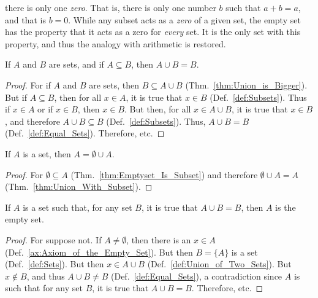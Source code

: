         there is only one \textit{zero}. That is, there is
        only one number $b$ such that $a+b=a$, and that is
        $b=0$. While any subset acts as a \textit{zero} of a
        given set, the empty set has the property that it
        acts as a zero for \textit{every} set. It is the only
        set with this property, and thus the analogy with
        arithmetic is restored.
        \begin{theorem}
            \label{thm:Union_With_Subset}%
            If $A$ and $B$ are sets, and if
            $A\subseteq{B}$, then $A\cup{B}=B$.
        \end{theorem}
        \begin{proof}
            For if $A$ and $B$ are sets, then
            $B\subseteq{A}\cup{B}$
            (Thm.~\ref{thm:Union_is_Bigger}).
            But if $A\subseteq{B}$, then for all $x\in{A}$,
            it is true that $x\in{B}$
            (Def.~\ref{def:Subsets}). Thus if $x\in{A}$ or if
            $x\in{B}$, then $x\in{B}$. But then, for all
            $x\in{A}\cup{B}$, it is true that $x\in{B}$, and
            therefore $A\cup{B}\subseteq{B}$
            (Def.~\ref{def:Subsets}). Thus,
            $A\cup{B}=B$ (Def.~\ref{def:Equal_Sets}).
            Therefore, etc.
        \end{proof}
        \begin{theorem}
            \label{thm:Union_with_Emptyset}%
            If $A$ is a set, then $A=\emptyset\cup{A}$.
        \end{theorem}
        \begin{proof}
            For $\emptyset\subseteq{A}$
            (Thm.~\ref{thm:Emptyset_Is_Subset}) and
            therefore $\emptyset\cup{A}=A$
            (Thm.~\ref{thm:Union_With_Subset}).
        \end{proof}
        \begin{theorem}
            \label{thm:Empty_Set_Is_Zero_for_Unions}%
            If $A$ is a set such that, for any set $B$, it is
            true that $A\cup{B}=B$, then $A$ is the
            empty set.
        \end{theorem}
        \begin{proof}
            For suppose not. If $A\ne\emptyset$, then there
            is an $x\in{A}$ (Def.~\ref{ax:Axiom_of_the_Empty_Set}).
            But then $B=\{A\}$ is a set
            (Def.~\ref{def:Sets}). But then $x\in{A}\cup{B}$
            (Def.~\ref{def:Union_of_Two_Sets}). But $x\notin{B}$,
            and thus $A\cup{B}\ne{B}$
            (Def.~\ref{def:Equal_Sets}), a contradiction
            since $A$ is such that for any set $B$, it is
            true that $A\cup{B}=B$. Therefore, etc.
        \end{proof}
